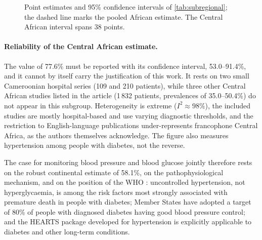 \begin{figure}[htbp]
\centering
{}
\caption{Point estimates and 95\% confidence intervals of \cref{tab:subregional}; the dashed line marks the pooled African estimate. The Central African interval spans 38 points.}\label{fig:forest}
\end{figure}

\paragraph{Reliability of the Central African estimate.}\label{sec:central-estimates} The value of 77.6\% must be reported with its confidence interval, 53.0--91.4\%, and it cannot by itself carry the justification of this work. It rests on two small Cameroonian hospital series (109 and 210 patients), while three other Central African studies listed in the article (1\,832 patients, prevalences of 35.0--50.4\%) do not appear in this subgroup. Heterogeneity is extreme ($I^2 \approx 98\%$), the included studies are mostly hospital-based and use varying diagnostic thresholds, and the restriction to English-language publications under-represents francophone Central Africa, as the authors themselves acknowledge. The figure also measures hypertension among people with diabetes, not the reverse.

The case for monitoring blood pressure and blood glucose jointly therefore rests on the robust continental estimate of 58.1\%, on the pathophysiological mechanism, and on the position of the WHO \parencite{who2023hypertension}: uncontrolled hypertension, not hyperglycaemia, is among the risk factors most strongly associated with premature death in people with diabetes; Member States have adopted a target of 80\% of people with diagnosed diabetes having good blood pressure control; and the HEARTS package developed for hypertension is explicitly applicable to diabetes and other long-term conditions.

